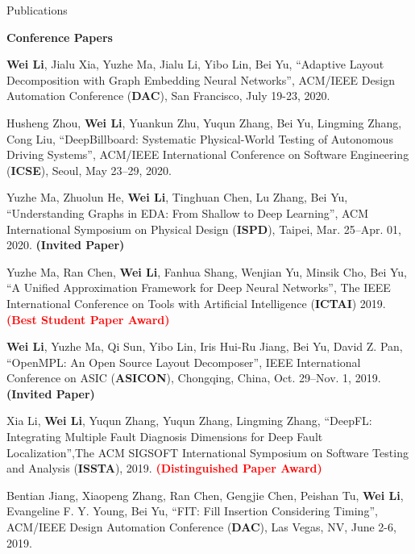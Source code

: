 \begin{rSection}{Publications}

\textbf{Conference Papers}
\begin{description}[font=\normalfont]
\item[{[C7]}]{
    \textbf{Wei Li}, Jialu Xia, Yuzhe Ma, Jialu Li, Yibo Lin, Bei Yu, 
    ``Adaptive Layout Decomposition with Graph Embedding Neural Networks'', 
    ACM/IEEE Design Automation Conference (\textbf{DAC}), San Francisco, July 19-23, 2020.
}
\item[{[C6]}]{
    Husheng Zhou, \textbf{Wei Li}, Yuankun Zhu, Yuqun Zhang, Bei Yu, Lingming Zhang, Cong Liu, 
    ``DeepBillboard: Systematic Physical-World Testing of Autonomous Driving Systems'', ACM/IEEE International Conference on Software Engineering (\textbf{ICSE}), Seoul, May 23–29, 2020.
}
\item[{[C5]}]{
    Yuzhe Ma, Zhuolun He, \textbf{Wei Li}, Tinghuan Chen, Lu Zhang, Bei Yu, 
    ``Understanding Graphs in EDA: From Shallow to Deep Learning'', ACM International Symposium on Physical Design (\textbf{ISPD}), Taipei, Mar. 25–Apr. 01, 2020. \textbf{(Invited Paper)}
}
\item[{[C4]}]{
    Yuzhe Ma, Ran Chen, \textbf{Wei Li}, Fanhua Shang, Wenjian Yu, Minsik Cho, Bei Yu, 
    ``A Unified Approximation Framework for Deep Neural Networks'', The IEEE International Conference on Tools with Artificial Intelligence (\textbf{ICTAI}) 2019. \textcolor{red}{\textbf{(Best Student Paper Award)}}
}
\item[{[C3]}]{
    \textbf{Wei Li}, Yuzhe Ma, Qi Sun, Yibo Lin, Iris Hui-Ru Jiang, Bei Yu, David Z. Pan,
    ``OpenMPL: An Open Source Layout Decomposer'', IEEE International Conference on ASIC (\textbf{ASICON}), Chongqing, China, Oct. 29–Nov. 1, 2019. \textbf{(Invited Paper)}
}
\item[{[C2]}]{
    Xia Li, \textbf{Wei Li}, Yuqun Zhang, Yuqun Zhang, Lingming Zhang, 
    ``DeepFL: Integrating Multiple Fault Diagnosis Dimensions for Deep Fault Localization'',The ACM SIGSOFT International Symposium on Software Testing and Analysis 
      (\textbf{ISSTA}), 2019. \textcolor{red}{\textbf{(Distinguished Paper Award)}}
}
\item[{[C1]}]{
    Bentian Jiang, Xiaopeng Zhang, Ran Chen, Gengjie Chen, Peishan Tu, \textbf{Wei Li}, Evangeline F. Y. Young, Bei Yu, 
    ``FIT: Fill Insertion Considering Timing'', 
    ACM/IEEE Design Automation Conference (\textbf{DAC}), Las Vegas, NV, June 2-6, 2019.
}


\end{description}


\end{rSection}

